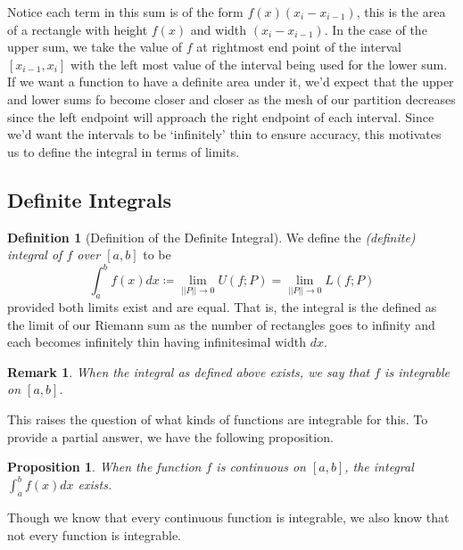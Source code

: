 \documentclass[12pt]{article}
\newcommand{\norm}[1]{ \left|\left| #1 \right|\right| }
\newtheorem{prop}[thm]{Proposition}
\theoremstyle{definition}
\newtheorem{defn}[thm]{Definition}
\theoremstyle{plain}
\newtheorem{rem}[thm]{Remark}
\numberwithin{equation}{section}
\begin{document}
Notice each term in this sum is of the form $f(x)(x_i-x_{i-1})$, this is the area of a rectangle with height $f(x)$ and width $(x_i-x_{i-1})$. In the case of the upper sum, we take the value of $f$ at rightmost end point of the interval $[x_{i-1},x_i]$ with the left most value of the interval being used for the lower sum. If we want a function to have a definite area under it, we'd expect that the upper and lower sums fo become closer and closer as the mesh of our partition decreases since the left endpoint will approach the right endpoint of each interval. Since we'd want the intervals to be `infinitely' thin to ensure accuracy, this motivates us to define the integral in terms of limits.

\subsection{Definite Integrals}

\begin{defn}[Definition of the Definite Integral]\label{DefInt}
We define the \emph{(definite) integral of $f$ over $[a,b]$} to be
\begin{equation}
  \int_{a}^{b}f(x)dx\coloneqq \lim\limits_{\norm{P}\to 0}U(f;P)=\lim\limits_{\norm{P}\to 0}L(f;P)
\end{equation}
provided both limits exist and are equal. That is, the integral is the defined as the limit of our Riemann sum as the number of rectangles goes to infinity and each becomes infinitely thin having infinitesimal width $dx$.
\end{defn}
\begin{rem}
When the integral as defined above exists, we say that $f$ is \emph{integrable} on $[a,b]$.
\end{rem}

This raises the question of what kinds of functions are integrable for this. To provide a partial answer, we have the following proposition.
\begin{prop}\label{IntExists}
    When the function $f$ is continuous on $[a,b]$, the integral $\int_{a}^{b}f(x)dx$ exists.
\end{prop}
Though we know that every continuous function is integrable, we also know that not every function is integrable.
\end{document}
